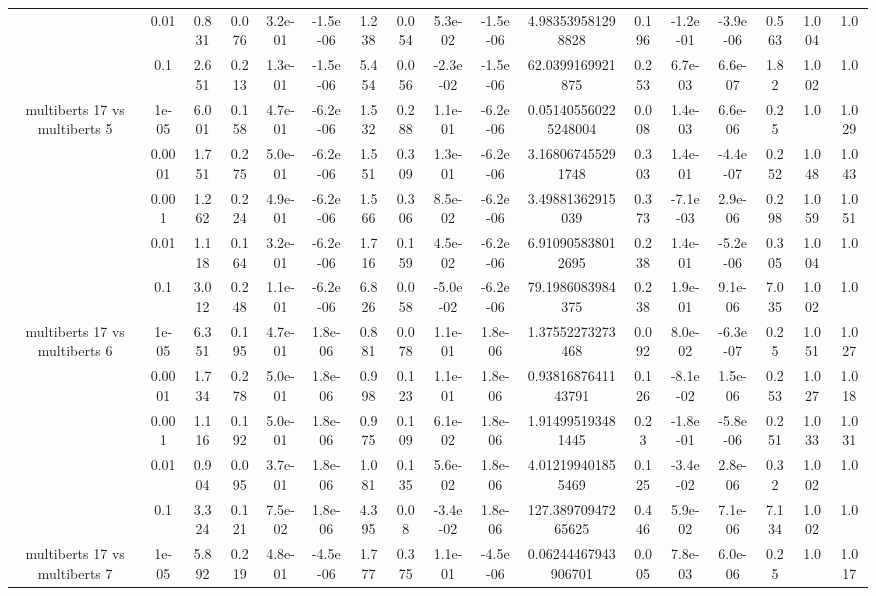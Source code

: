 \begin{tabular}{|c|c|c|c|c|c|c|c|c|c|c|c|c|c|c|c|c|}
 & 0.01 & 0.831 & 0.076 & 3.2e-01 & -1.5e-06 & 1.238 & 0.054 & 5.3e-02 & -1.5e-06 & 4.983539581298828 & 0.196 & -1.2e-01 & -3.9e-06 & 0.563 & 1.004 & 1.0 \\
 & 0.1 & 2.651 & 0.213 & 1.3e-01 & -1.5e-06 & 5.454 & 0.056 & -2.3e-02 & -1.5e-06 & 62.0399169921875 & 0.253 & 6.7e-03 & 6.6e-07 & 1.82 & 1.002 & 1.0 \\
\hline
\multirow{5}{*}{multiberts 17 vs multiberts 5} & 1e-05 & 6.001 & 0.158 & 4.7e-01 & -6.2e-06 & 1.532 & 0.288 & 1.1e-01 & -6.2e-06 & 0.051405560225248004 & 0.008 & 1.4e-03 & 6.6e-06 & 0.25 & 1.0 & 1.029 \\
 & 0.0001 & 1.751 & 0.275 & 5.0e-01 & -6.2e-06 & 1.551 & 0.309 & 1.3e-01 & -6.2e-06 & 3.168067455291748 & 0.303 & 1.4e-01 & -4.4e-07 & 0.252 & 1.048 & 1.043 \\
 & 0.001 & 1.262 & 0.224 & 4.9e-01 & -6.2e-06 & 1.566 & 0.306 & 8.5e-02 & -6.2e-06 & 3.49881362915039 & 0.373 & -7.1e-03 & 2.9e-06 & 0.298 & 1.059 & 1.051 \\
 & 0.01 & 1.118 & 0.164 & 3.2e-01 & -6.2e-06 & 1.716 & 0.159 & 4.5e-02 & -6.2e-06 & 6.910905838012695 & 0.238 & 1.4e-01 & -5.2e-06 & 0.305 & 1.004 & 1.0 \\
 & 0.1 & 3.012 & 0.248 & 1.1e-01 & -6.2e-06 & 6.826 & 0.058 & -5.0e-02 & -6.2e-06 & 79.1986083984375 & 0.238 & 1.9e-01 & 9.1e-06 & 7.035 & 1.002 & 1.0 \\
\hline
\multirow{5}{*}{multiberts 17 vs multiberts 6} & 1e-05 & 6.351 & 0.195 & 4.7e-01 & 1.8e-06 & 0.881 & 0.078 & 1.1e-01 & 1.8e-06 & 1.37552273273468 & 0.092 & 8.0e-02 & -6.3e-07 & 0.25 & 1.051 & 1.027 \\
 & 0.0001 & 1.734 & 0.278 & 5.0e-01 & 1.8e-06 & 0.998 & 0.123 & 1.1e-01 & 1.8e-06 & 0.9381687641143791 & 0.126 & -8.1e-02 & 1.5e-06 & 0.253 & 1.027 & 1.018 \\
 & 0.001 & 1.116 & 0.192 & 5.0e-01 & 1.8e-06 & 0.975 & 0.109 & 6.1e-02 & 1.8e-06 & 1.914995193481445 & 0.23 & -1.8e-01 & -5.8e-06 & 0.251 & 1.033 & 1.031 \\
 & 0.01 & 0.904 & 0.095 & 3.7e-01 & 1.8e-06 & 1.081 & 0.135 & 5.6e-02 & 1.8e-06 & 4.012199401855469 & 0.125 & -3.4e-02 & 2.8e-06 & 0.32 & 1.002 & 1.0 \\
 & 0.1 & 3.324 & 0.121 & 7.5e-02 & 1.8e-06 & 4.395 & 0.08 & -3.4e-02 & 1.8e-06 & 127.38970947265625 & 0.446 & 5.9e-02 & 7.1e-06 & 7.134 & 1.002 & 1.0 \\
\hline
\multirow{5}{*}{multiberts 17 vs multiberts 7} & 1e-05 & 5.892 & 0.219 & 4.8e-01 & -4.5e-06 & 1.777 & 0.375 & 1.1e-01 & -4.5e-06 & 0.06244467943906701 & 0.005 & 7.8e-03 & 6.0e-06 & 0.25 & 1.0 & 1.017 \\

\end{tabular}
